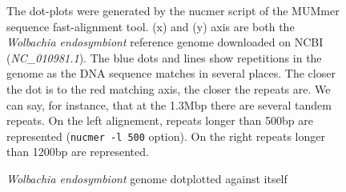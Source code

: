 \documentclass[12pt]{article}
\begin{document}
\begin{figure}[h!]
\begin{center}
{
}
\end{center}
\caption{\textit{Wolbachia endosymbiont} genome dotplotted against itself}
{\footnotesize The dot-plots were generated by the nucmer script of the MUMmer \cite{delcher_alignment_1999,delcher_fast_2002,} sequence fast-alignment tool. (x) and (y) axis are both the \textit{Wolbachia endosymbiont} reference genome downloaded on NCBI 
(\textit{NC\_010981.1}). The blue dots and lines show repetitions in the genome as the DNA sequence matches in several places. The closer the dot is to the red matching axis, the closer the repeats are. We can say, for instance, that at the 1.3Mbp there are several tandem repeats. On the left alignement, repeats longer than 500bp are represented (\texttt{nucmer -l 500} option). On the right repeats longer than 1200bp are represented.}
\label{fig:wolbarepeats}
\end{figure}
\newpage
\end{document}
